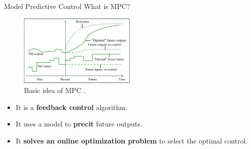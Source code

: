 \documentclass{thesisbeamer}
\begin{document}
\begin{frame}[t]{Model Predictive Control} 
What is MPC?

 \begin{figure}[t]
 \centering
 \includegraphics[width=0.5\textwidth]{Images/control/MPC_general_idea}
 \caption{Basic idea of MPC \cite{How2008}.}
 \label{MPC_basic_idea}
\end{figure}  



\begin{itemize}[<+->]
	\item It is a \textbf{feedback control} algorithm.
	\item It uses a model to \textbf{precit} future outputs.
	\item It \textbf{solves an online optimization problem} to select the optimal control.
\end{itemize}
\end{frame}
\end{document}
